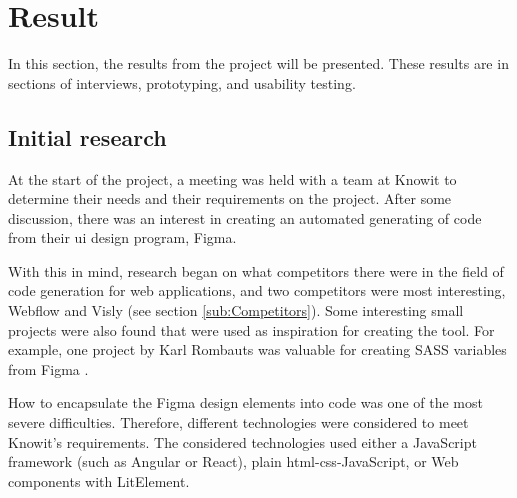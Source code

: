 \section{Result}


In this section, the results from the project will be presented. These results are in sections of interviews, prototyping, and usability testing.

\subsection{Initial research}
\label{sub:Initial research}

At the start of the project, a meeting was held with a team at Knowit to determine their needs and their requirements on the project. After some discussion, there was an interest in creating an automated generating of code from their \acrshort{ui} design program, Figma. 

With this in mind, research began on what competitors there were in the field of code generation for web applications, and two competitors were most interesting, Webflow and Visly (see section \ref{sub:Competitors}). Some interesting small projects were also found that were used as inspiration for creating the tool. For example, one project by Karl Rombauts was valuable for creating SASS variables from Figma \cite{rombautsKarlRombautsFigmaSCSSGenerator2021}.

How to encapsulate the Figma design elements into code was one of the most severe difficulties. Therefore, different technologies were considered to meet Knowit's requirements. The considered technologies used either a JavaScript framework (such as Angular or React), plain \acrshort{html}-\acrshort{css}-JavaScript, or Web \glspl{component} with LitElement. 

